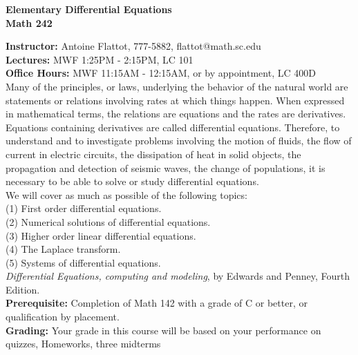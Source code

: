 \documentclass[12pt]{amsart}
\begin{document}
\thispagestyle{empty}
\begin{center}
\Large{\bf Elementary Differential Equations \\ Math 242}
\end{center}
\vspace*{0.8cm}
\large{{\bf Instructor:} Antoine Flattot, 777-5882, flattot@math.sc.edu}\\
\large{{\bf Lectures:} MWF 1:25PM - 2:15PM, LC 101}\\
\large{{\bf Office Hours:} MWF 11:15AM - 12:15AM, or by appointment, LC 400D}\\[0.8cm]
 Many of the principles, or laws, underlying the behavior of the natural world
are statements or relations involving rates at which things happen. When expressed in mathematical
terms, the relations are equations and the rates are derivatives. Equations containing derivatives are
called differential equations. Therefore, to understand and to investigate problems involving the 
motion of fluids, the flow of current in electric circuits, the dissipation of heat in solid objects,
the propagation and detection of seismic waves, the change of populations, it is necessary to 
be able to solve or study differential equations.\\[0.3cm] 
 We will cover as much as possible of the following topics:\\
\hspace*{0.3cm} (1) First order differential equations.\\
\hspace*{0.3cm} (2) Numerical solutions of differential equations.\\
\hspace*{0.3cm} (3) Higher order linear differential equations.\\
\hspace*{0.3cm} (4) The Laplace transform.\\
\hspace*{0.3cm} (5) Systems of differential equations.\\[0.3cm]
 {\em Differential Equations, computing and modeling}, by Edwards and Penney,
Fourth Edition.\\[0.3cm]
{\bf Prerequisite:} Completion of Math 142 with a grade of C or better, or qualification by placement.\\[0.3cm]
{\bf Grading:} Your grade in this course will be based on your performance on  quizzes, Homeworks, three midterms 
\end{document}
